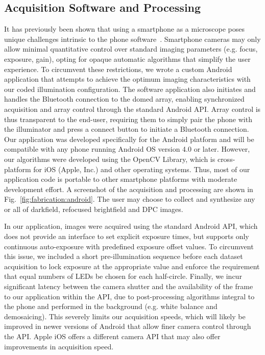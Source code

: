 \subsection{Acquisition Software and Processing}
It has previously been shown that using a smartphone as a microscope poses unique challenges intrinsic to the phone software~\cite{skandarajah2014quantitative}. Smartphone cameras may only allow minimal quantitative control over standard imaging parameters (e.g. focus, exposure, gain), opting for opaque automatic algorithms that simplify the user experience. To circumvent these restrictions, we wrote a custom Android application that attempts to achieve the optimum imaging characteristics with our coded illumination configuration. The software application also initiates and handles the Bluetooth connection to the domed array, enabling synchronized acquisition and array control through the standard Android API. Array control is thus transparent to the end-user, requiring them to simply pair the phone with the illuminator and press a connect button to initiate a Bluetooth connection. Our application was developed specifically for the Android platform and will be compatible with any phone running Android OS version 4.0 or later. However, our algorithms were developed using the OpenCV Library, which is cross-platform for iOS (Apple, Inc.) and other operating systems. Thus, most of our application code is portable to other smartphone platforms with moderate development effort. A screenshot of the acquisition and processing are shown in Fig.~\ref{fig:fabrication:android}. The user may choose to collect and synthesize any or all of darkfield, refocused brightfield and DPC images.

In our application, images were acquired using the standard Android API, which does not provide an interface to set explicit exposure times, but supports only continuous auto-exposure with predefined exposure offset values. To circumvent this issue, we included a short pre-illumination sequence before each dataset acquisition to lock exposure at the appropriate value and enforce the requirement that equal numbers of LEDs be chosen for each half-circle. Finally, we incur significant latency between the camera shutter and the availability of the frame to our application within the API, due to post-processing algorithms integral to the phone and performed in the background (e.g. white balance and demosaicing). This severely limits our acquisition speeds, which will likely be improved in newer versions of Android that allow finer camera control through the API. Apple iOS offers a different camera API that may also offer improvements in acquisition speed.


